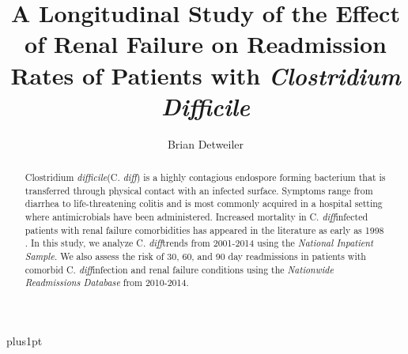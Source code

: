 \documentclass[12pt]{ociamthesis}\usepackage[]{graphicx}\usepackage[]{color}
\title{A Longitudinal Study of the Effect of Renal Failure on Readmission Rates of Patients with \textit{Clostridium Difficile}}
\author{Brian Detweiler}
\newcommand{\cdifficile}{Clostridium \textit{difficile}}
\newcommand{\cdiff}{C. \textit{diff}}
\begin{document}
\baselineskip=18pt plus1pt

\setcounter{secnumdepth}{3}
\setcounter{tocdepth}{3}


\maketitle                  %

 


\begin{abstract}
\cdifficile (\cdiff)
is a highly contagious endospore forming bacterium that is transferred
through physical contact with an infected surface. Symptoms range from diarrhea to
life-threatening colitis and is most commonly acquired in a hospital setting where
antimicrobials have been administered. Increased mortality in
\cdiff infected patients with renal failure comorbidities has appeared in the literature as early as 1998 \cite{Cunney1998}.
In this study, we analyze \cdiff trends from 2001-2014 using the \textit{National Inpatient Sample}. We also  
assess the risk of 30, 60, and 90 day readmissions in patients with comorbid \cdiff infection and renal failure conditions
using the \textit{Nationwide Readmissions Database} from 2010-2014. 
\end{abstract}

\begin{romanpages}          %
\tableofcontents            %
\listoffigures              %
\listoftables
\end{romanpages}            %


















\end{document}
